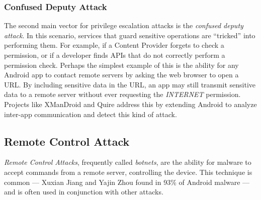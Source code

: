 \documentclass{acm_proc_article-sp}
\begin{document}

\subsubsection{Confused Deputy Attack}
The second main vector for privilege escalation attacks is the \textit{confused deputy attack}\citep{hardy1988confused}. In this scenario, services that guard sensitive operations are ``tricked'' into performing them. For example, if a Content Provider forgets to check a permission, or if a developer finds APIs that do not correctly perform a permission check. Perhaps the simplest example of this is the ability for any Android app to contact remote servers by asking the web browser to open a URL. By including sensitive data in the URL, an app may still transmit sensitive data to a remote server without ever requesting the \textit{INTERNET} permission. Projects like XManDroid\citep{bugiel2011xmandroid} and Quire\citep{dietz2011quire} address this by extending Android to analyze inter-app communication and detect this kind of attack. %

\subsection{Remote Control Attack}
\textit{Remote Control Attacks}, frequently called \textit{botnets}, are the ability for malware to accept commands from a remote server, controlling the device. This technique is common --- Xuxian Jiang
 and Yajin Zhou\citep{zhou2012dissecting} found in 93\% of Android malware --- and is often used in conjunction with other attacks\citep{spreitzenbarth2013}.
\end{document}
